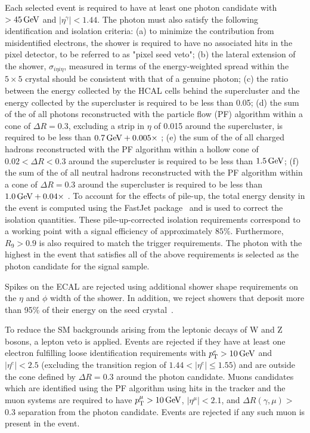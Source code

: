    Each selected event is required to have at least one photon candidate with  \etg\ $ > 45 \,\text{Ge\hspace{-.08em}V}$ and $|\eta^{\gamma}| < 1.44$.
		The photon must also satisfy the following identification and isolation criteria:
		(a) to minimize the contribution from misidentified electrons, the shower is required to have no associated hits in the pixel detector, to be referred to as "pixel seed veto";
		(b) the lateral extension of the shower, $\sigma_{i\eta i\eta}$, measured in terms of the energy-weighted spread within the $5\times 5$ crystal should be consistent with that of a genuine photon;
		(c) the ratio between the energy collected by the HCAL cells behind the supercluster and the energy collected by the supercluster is required to be less than 0.05;
		(d) the sum of the \et of all photons reconstructed with the particle flow (PF) algorithm within a cone of $\Delta R = 0.3$, excluding a strip in $\eta$ of 0.015 around the supercluster, is required to be less than $0.7 \,\text{Ge\hspace{-.08em}V} +0.005 \times$ \etg;
		(e) the sum of the \et of all charged hadrons reconstructed with the PF algorithm within a hollow cone of $0.02 < \Delta R < 0.3$ around the supercluster is required to be less than $1.5 \,\text{Ge\hspace{-.08em}V}$;
		(f) the sum of the \et of all neutral hadrons reconstructed with the PF algorithm within a cone of $\Delta R = 0.3$ around the supercluster is required to be less than $1.0 \,\text{Ge\hspace{-.08em}V} +0.04 \times$ \etg.
		To account for the effects of pile-up, the total energy density in the event is computed using the {\sc FastJet} package~\cite{Cacciari:2011ma} and is used to correct the isolation quantities.
		These pile-up-corrected isolation requirements correspond to a working point with a signal efficiency of approximately $85\%$. Furthermore, $R_{9} > 0.9$ is also required to match the trigger requirements.
		The photon with the highest \et in the event that satisfies all of the above requirements is selected as the photon candidate for the signal sample.

		Spikes on the ECAL are rejected using additional shower shape requirements on the $\eta$ and $\phi$ width of the shower. In addition, we reject showers that deposit more than 95\% of their energy on the seed crystal~\cite{spikecleaning}.  

        To reduce the SM backgrounds arising from the leptonic decays of W and Z bosons, a lepton veto is applied. Events are rejected if they have at least one electron fulfilling loose identification requirements \cite{ele_id} with $p_{\mathrm{T}}^{e} > 10\,\text{Ge\hspace{-.08em}V}$ and $|\eta^{e}| < 2.5$ (excluding the transition region of $1.44 < |\eta^{e}| \leq 1.55$) and are outside the cone defined by $\Delta R = 0.3$ around the photon candidate. Muons candidates which are identified using the PF algorithm using hits in the tracker and the muon systems are required to have $p_{\mathrm{T}}^{\mu} > 10\,\text{Ge\hspace{-.08em}V}$, $|\eta^{\mu}| < 2.1$, and $\Delta R(\gamma,\mu) > $0.3 separation from the photon candidate. Events are rejected if any such muon is present in the event.

